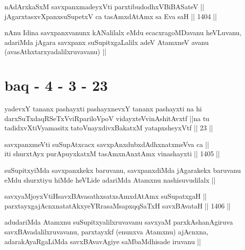 
\begin{shl}
nAdArxkaSxM savxpanxmadeyxVti parxtibudodhxV\s BiBASateV ||  \\
jAgarxtasxvXpanxsuSupetxV ca tasAmxdAtAmx sa Eva saH ||  1404 ||  
\end{shl}

\begin{artha}
nAnu Idina savxpanxvanunx kANalilalx eMdu ecacxragoMDavanu heVLuvanu, adariMda jAgara savxpanx suSupitxgaLalilx adeV AtamxneV avanu (avasAthxtarxyadalilxruvavanu) ||
\end{artha}

\section*{baq - 4 - 3 - 23}

\begin{shl}
yadevxY tananx pashayxti pashayxnevxY tananx pashayxti na hi darxSuTxdaqRSeTxVviRpariloVpoV vidayxteV\s vinAshitAvxtf ||na tu tadidxvXtiVyamasitx tatoV\s nayxdivxBakatxM yatapxsheyxVtf || 23 ||
\end{shl}


\begin{shl}
savxpanxmeVti suSupAtxcacx savxpAnxdubxdAdhxnatxmeVva ca || \\
iti shurxtAyx purA\s puyxkatxM tasAmxnAnx\s \s tAmx vinashayxti ||  1405 ||  
\end{shl}

\begin{artha}
suSupitxyiMda savxpanxkekx baruvanu, savxpanxdiMda jAgarakekx baruvanu eMdu shurxtiyu hiMde heVLide adariMda Atamxnu nashisuvudilalx ||
\end{artha}


\begin{shl}
savxyaMjoyxVtiHsavxBAvasathxsatxsAmxdAtAmx suSupatxgaH || \\
parxtayxgajAcnxnatatAkxyeYRrasaMsapxqqSaTxH savxBAvataH ||  1406 ||  
\end{shl}

\begin{artha}
adudariMda Atamxnu suSupitxyalilxruvavanu savxyaM parxkAshanAgiruva savxBAvadalilxruvavanu, parxtayxkf (enunxva Atamxnu) ajAcnxna, adarakAyaRgaLiMda savxBAvavAgiye saMbaMdhisade iruvanu ||
\end{artha}

